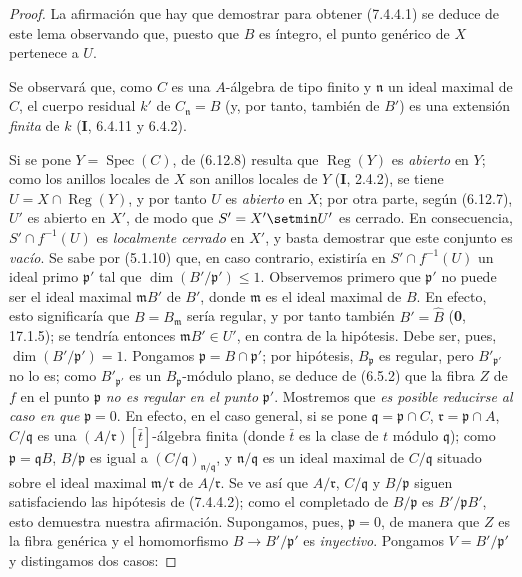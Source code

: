 \begin{proof}
La afirmación que hay que demostrar para obtener (7.4.4.1) se deduce
de este lema observando que, puesto que $B$ es íntegro, el punto
genérico de $X$ pertenece a $U$.

Se observará que, como $C$ es una $A$-álgebra de tipo finito y $\mathfrak n$
un ideal maximal de $C$, el cuerpo residual $k'$ de
$C_{\mathfrak n}=B$ (y, por tanto, también de $B'$) es una extensión
\emph{finita} de $k$ (\textbf I, 6.4.11 y 6.4.2).

Si se pone $Y=\operatorname{Spec}(C)$, de (6.12.8) resulta que
$\operatorname{Reg}(Y)$ es \emph{abierto} en $Y$; como los anillos locales de
$X$ son anillos locales de $Y$ (\textbf I, 2.4.2), se tiene
$U=X\cap\operatorname{Reg}(Y)$, y por tanto $U$ es \emph{abierto} en $X$; por
otra parte, según (6.12.7), $U'$ es abierto en $X'$, de modo que
$S'=X'\setmin U'$ es cerrado. En consecuencia, $S'\cap f^{-1}(U)$ es
\emph{localmente cerrado} en $X'$, y basta demostrar que este conjunto es
\emph{vacío}. Se sabe por (5.1.10) que, en caso contrario, existiría en
$S'\cap f^{-1}(U)$ un ideal primo $\mathfrak p'$ tal que
$\dim(B'/\mathfrak p')\leqslant1$. Observemos primero que
$\mathfrak p'$ no puede ser el ideal maximal $\mathfrak mB'$ de $B'$,
donde $\mathfrak m$ es el ideal maximal de $B$. En efecto, esto
significaría que $B=B_{\mathfrak m}$ sería regular, y por tanto también
$B'=\widehat B$ (\textbf{0}, 17.1.5); se tendría entonces $\mathfrak mB'\in U'$,
en contra de la hipótesis. Debe ser, pues,
$\dim(B'/\mathfrak p')=1$. Pongamos
$\mathfrak p=B\cap\mathfrak p'$; por hipótesis, $B_{\mathfrak p}$ es
regular, pero $B'_{\mathfrak p'}$ no lo es; como
$B'_{\mathfrak p'}$ es un $B_{\mathfrak p}$-módulo plano, se deduce de
(6.5.2) que la fibra $Z$ de $f$ en el punto $\mathfrak p$ \emph{no es regular
en el punto} $\mathfrak p'$. Mostremos que \emph{es posible reducirse al caso en
que} $\mathfrak p=0$. En efecto, en el caso general, si se pone
$\mathfrak q=\mathfrak p\cap C$, $\mathfrak r=\mathfrak p\cap A$,
$C/\mathfrak q$ es una $(A/\mathfrak r)[\bar t]$-álgebra finita (donde
$\bar t$ es la clase de $t$ módulo $\mathfrak q$); como
$\mathfrak p=\mathfrak qB$, $B/\mathfrak p$ es igual a
$(C/\mathfrak q)_{\mathfrak n/\mathfrak q}$, y
$\mathfrak n/\mathfrak q$ es un ideal maximal de $C/\mathfrak q$
situado sobre el ideal maximal $\mathfrak m/\mathfrak r$ de
$A/\mathfrak r$. Se ve así que $A/\mathfrak r$, $C/\mathfrak q$ y
$B/\mathfrak p$ siguen satisfaciendo las hipótesis de (7.4.4.2); como
el completado de $B/\mathfrak p$ es $B'/\mathfrak pB'$, esto demuestra
nuestra afirmación. Supongamos, pues, $\mathfrak p=0$, de manera que
$Z$ es la fibra genérica y el homomorfismo $B\to B'/\mathfrak p'$ es
\emph{inyectivo}. Pongamos $V=B'/\mathfrak p'$ y distingamos dos casos:


\end{proof}
